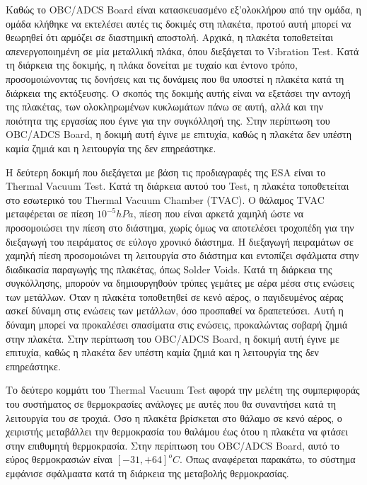 \documentclass[a4paper,nobib,justified]{tufte-book}
\begin{document}
	Καθώς το OBC/ADCS Board είναι κατασκευασμένο εξ'ολοκλήρου από την ομάδα, η ομάδα κλήθηκε να εκτελέσει αυτές τις δοκιμές στη πλακέτα, προτού αυτή μπορεί να θεωρηθεί ότι αρμόζει σε διαστημική αποστολή. Αρχικά, η πλακέτα τοποθετείται απενεργοποιημένη σε μία μεταλλική πλάκα, όπου διεξάγεται το Vibration Test. Κατά τη διάρκεια της δοκιμής, η πλάκα δονείται με τυχαίο και έντονο τρόπο, προσομοιώνοντας τις δονήσεις και τις δυνάμεις που θα υποστεί η πλακέτα κατά τη διάρκεια της εκτόξευσης. Ο σκοπός της δοκιμής αυτής είναι να εξετάσει την αντοχή της πλακέτας, των ολοκληρωμένων κυκλωμάτων πάνω σε αυτή, αλλά και την ποιότητα της εργασίας που έγινε για την συγκόλλησή της. Στην περίπτωση του OBC/ADCS Board, η δοκιμή αυτή έγινε με επιτυχία, καθώς η πλακέτα δεν υπέστη καμία ζημιά και η λειτουργία της δεν επηρεάστηκε.

	Η δεύτερη δοκιμή που διεξάγεται με βάση τις προδιαγραφές της ESA είναι το Thermal Vacuum Test. Κατά τη διάρκεια αυτού του Test, η πλακέτα τοποθετείται στο εσωτερικό του Thermal Vacuum Chamber (TVAC). Ο θάλαμος TVAC μεταφέρεται σε πίεση $10^{-5} hPa$, πίεση που είναι αρκετά χαμηλή ώστε να προσομοιώσει την πίεση στο διάστημα, χωρίς όμως να αποτελέσει τροχοπέδη για την διεξαγωγή του πειράματος σε εύλογο χρονικό διάστημα. Η διεξαγωγή πειραμάτων σε χαμηλή πίεση προσομοιώνει τη λειτουργία στο διάστημα και εντοπίζει σφάλματα στην διαδικασία παραγωγής της πλακέτας, όπως Solder Voids. Κατά τη διάρκεια της συγκόλλησης, μπορούν να δημιουργηθούν τρύπες γεμάτες με αέρα μέσα στις ενώσεις των μετάλλων. Όταν η πλακέτα τοποθετηθεί σε κενό αέρος, ο παγιδευμένος αέρας ασκεί δύναμη στις ενώσεις των μετάλλων, όσο προσπαθεί να δραπετεύσει. Αυτή η δύναμη μπορεί να προκαλέσει σπασίματα στις ενώσεις, προκαλώντας σοβαρή ζημιά στην πλακέτα. Στην περίπτωση του OBC/ADCS Board, η δοκιμή αυτή έγινε με επιτυχία, καθώς η πλακέτα δεν υπέστη καμία ζημιά και η λειτουργία της δεν επηρεάστηκε.

	\par Το δεύτερο κομμάτι του Thermal Vacuum Test αφορά την μελέτη της συμπεριφοράς του συστήματος σε θερμοκρασίες ανάλογες με αυτές που θα συναντήσει κατά τη λειτουργία του σε τροχιά. Όσο η πλακέτα βρίσκεται στο θάλαμο σε κενό αέρος, ο χειριστής μεταβάλλει την θερμοκρασία του θαλάμου έως ότου η πλακέτα να φτάσει στην επιθυμητή θερμοκρασία. Στην περίπτωση του OBC/ADCS Board, αυτό το εύρος θερμοκρασιών είναι $[-31,+64] ^o C$. Όπως αναφέρεται παρακάτω, το σύστημα εμφάνισε σφάλμαατα κατά τη διάρκεια της μεταβολής θερμοκρασίας.
\end{document}
